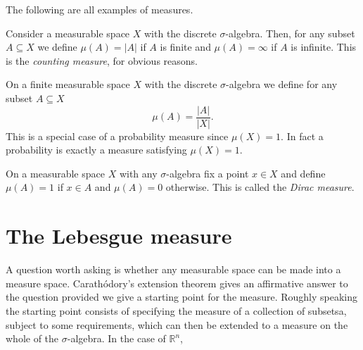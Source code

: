 \documentclass[12pt,oneside]{book}
\numberwithin{table}{section}
\numberwithin{equation}{section}
\numberwithin{figure}{section}
\newcommand{\R}{\mathbb{R}}
\newcommand{\abs}[1]{\lvert #1 \rvert}
\begin{document}
\begin{exe}
	The following are all examples of measures.
	\begin{points}
	\item Consider a measurable space \( X \) with the discrete \( \sigma \)-algebra. Then, for any subset \( A \subseteq X \) we define \( \mu(A) = \abs{A} \) if \( A \) is finite and \( \mu(A) = \infty \) if \( A \) is infinite. This is the \emph{counting measure}, for obvious reasons.
	\item On a finite measurable space \( X \) with the discrete \( \sigma \)-algebra we define for any subset \( A \subseteq X \)
		\begin{equation*}
			\mu(A) = \frac{\abs{A}}{\abs{X}}.
		\end{equation*}
		This is a special case of a probability measure since \( \mu(X) = 1 \). In fact a probability is exactly a measure satisfying \( \mu(X) = 1 \).
	\item On a measurable space \( X \) with any \( \sigma \)-algebra fix a point \( x \in X \) and define \( \mu(A) = 1 \) if \( x \in A \) and \( \mu(A) = 0 \) otherwise. This is called the \emph{Dirac measure}.
	\end{points}
\end{exe}

\section{The Lebesgue measure}
A question worth asking is whether any measurable space can be made into a measure space. Carathódory's extension theorem gives an affirmative answer to the question provided we give a starting point for the measure. Roughly speaking the starting point consists of specifying the measure of a collection of subsetsa, subject to some requirements, which can then be extended to a measure on the whole of the \( \sigma \)-algebra. In the case of \( \R^n \), 
\end{document}
